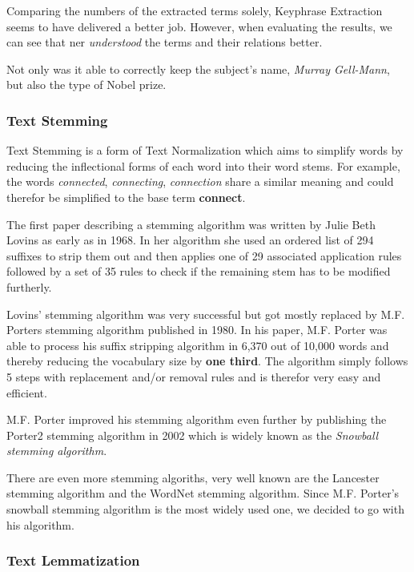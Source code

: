 Comparing the numbers of the extracted terms solely, Keyphrase Extraction seems to have delivered a better job.
However, when evaluating the results, we can see that \Gls{ner} \textit{understood} the terms and their
relations better.

Not only was it able to correctly keep the subject's name, \textit{Murray Gell-Mann}, but also the type of Nobel prize.


\subsubsection{Text Stemming}
\label{subsubsec:3_text_stemming}

Text Stemming is a form of Text Normalization which aims to simplify words
by reducing the inflectional forms of each word into their word stems.
For example, the words \textit{connected}, \textit{connecting}, \textit{connection} share a similar meaning and could
therefor be simplified to the base term \textbf{connect}.

The first paper describing a stemming algorithm was written by Julie Beth Lovins\cite{LovinsStemmer}
as early as in 1968.
In her algorithm she used an ordered list of 294 suffixes to strip them out and then applies one of
29 associated application rules followed by a set of 35 rules to check if the remaining stem has to be
modified furtherly.

Lovins' stemming algorithm was very successful but got mostly replaced by
M.F. Porters stemming algorithm\cite{PorterStemmerAlgorithm} published in 1980.
In his paper, M.F. Porter was able to process his suffix stripping algorithm in 6,370 out of 10,000 words and thereby
reducing the vocabulary size by \textbf{one third}.
The algorithm simply follows 5 steps with replacement and/or removal rules and is therefor very easy and efficient.

M.F. Porter improved his stemming algorithm even further
by publishing the Porter2 stemming algorithm\cite{SnowballStemmerAlgorithm} in 2002
which is widely known as the \textit{Snowball stemming algorithm}.

There are even more stemming algoriths, very well known are the Lancester stemming algorithm\cite{LancesterStemmer}
and the WordNet stemming algorithm\cite{WordNetStemmer}.
Since M.F. Porter's snowball stemming algorithm is the most widely used one, we decided to go with his algorithm.

\subsubsection{Text Lemmatization}
\label{subsubsec:3_text_lemmatization}

